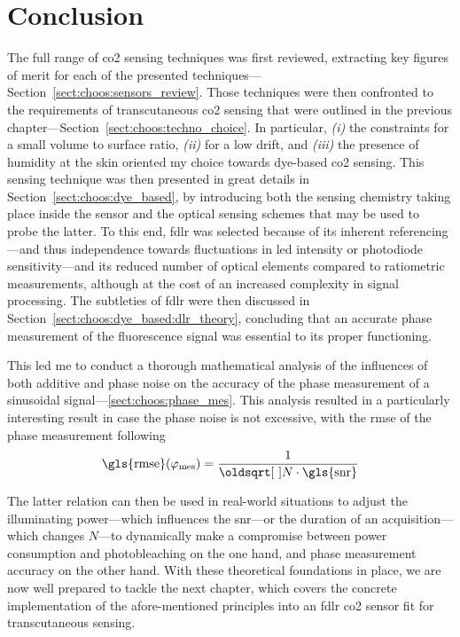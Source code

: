 \clearpage


\section{Conclusion}\label{sect:choos:conclusion}

The full range of \gls{co2} sensing techniques was first reviewed, extracting key figures of merit for each of the presented techniques---Section~\ref{sect:choos:sensors_review}. Those techniques were then confronted to the requirements of transcutaneous \gls{co2} sensing that were outlined in the previous chapter---Section~\ref{sect:choos:techno_choice}. In particular, \textit{(i)} the constraints for a small volume to surface ratio, \textit{(ii)} for a low drift, and \textit{(iii)} the presence of humidity at the skin oriented my choice towards dye-based \gls{co2} sensing. This sensing technique was then presented in great details in Section~\ref{sect:choos:dye_based}, by introducing both the sensing chemistry taking place inside the sensor and the optical sensing schemes that may be used to probe the latter. To this end, \gls{fdlr} was selected because of its inherent referencing---and thus independence towards fluctuations in \gls{led} intensity or photodiode sensitivity---and its reduced number of optical elements compared to ratiometric measurements, although at the cost of an increased complexity in signal processing. The subtleties of \gls{fdlr} were then discussed in Section~\ref{sect:choos:dye_based:dlr_theory}, concluding that an accurate phase measurement of the fluorescence signal was essential to its proper functioning.

This led me to conduct a thorough mathematical analysis of the influences of both additive and phase noise on the accuracy of the phase measurement of a sinusoidal signal---\ref{sect:choos:phase_mes}. This analysis resulted in a particularly interesting result in case the phase noise is not excessive, with the \gls{rmse} of the phase measurement following
\begin{equation}
	\text{\gls{rmse}}(\varphi_\text{mes}) = \frac{1}{\sqrt{N \cdot \text{\gls{snr}}}}
\end{equation}

The latter relation can then be used in real-world situations to adjust the illuminating power---which influences the \gls{snr}---or the duration of an acquisition---which changes $N$---to dynamically make a compromise between power consumption and photobleaching on the one hand, and phase measurement accuracy on the other hand. With these theoretical foundations in place, we are now well prepared to tackle the next chapter, which covers the concrete implementation of the afore-mentioned principles into an \gls{fdlr} \gls{co2} sensor fit for transcutaneous sensing.